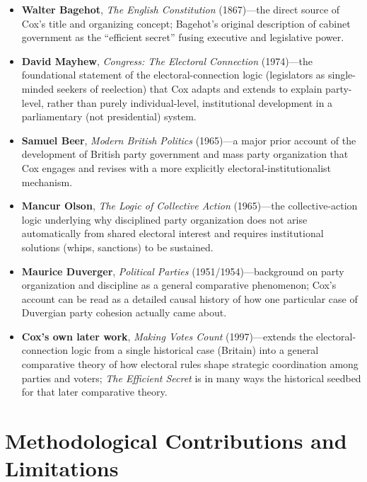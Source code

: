 \documentclass[12pt]{article}
\begin{document}
\begin{itemize}[leftmargin=*, itemsep=4pt]
    \item \textbf{Walter Bagehot}, \textit{The English Constitution} (1867)---the direct source of Cox's title and organizing concept; Bagehot's original description of cabinet government as the ``efficient secret'' fusing executive and legislative power.
    \item \textbf{David Mayhew}, \textit{Congress: The Electoral Connection} (1974)---the foundational statement of the electoral-connection logic (legislators as single-minded seekers of reelection) that Cox adapts and extends to explain party-level, rather than purely individual-level, institutional development in a parliamentary (not presidential) system.
    \item \textbf{Samuel Beer}, \textit{Modern British Politics} (1965)---a major prior account of the development of British party government and mass party organization that Cox engages and revises with a more explicitly electoral-institutionalist mechanism.
    \item \textbf{Mancur Olson}, \textit{The Logic of Collective Action} (1965)---the collective-action logic underlying why disciplined party organization does not arise automatically from shared electoral interest and requires institutional solutions (whips, sanctions) to be sustained.
    \item \textbf{Maurice Duverger}, \textit{Political Parties} (1951/1954)---background on party organization and discipline as a general comparative phenomenon; Cox's account can be read as a detailed causal history of how one particular case of Duvergian party cohesion actually came about.
    \item \textbf{Cox's own later work}, \textit{Making Votes Count} (1997)---extends the electoral-connection logic from a single historical case (Britain) into a general comparative theory of how electoral rules shape strategic coordination among parties and voters; \textit{The Efficient Secret} is in many ways the historical seedbed for that later comparative theory.
\end{itemize}

\section{Methodological Contributions and Limitations}
\end{document}
